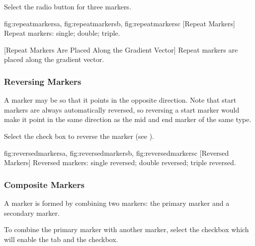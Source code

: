 
Select the  radio button for three markers.

{
  {fig:repeatmarkersa}{}{},
  {fig:repeatmarkersb}{}{},
  {fig:repeatmarkersc}{}{}
}
[Repeat Markers]
{Repeat markers:
 single;
 double;
 triple.}

{}
[Repeat Markers Are Placed Along the Gradient Vector]
{Repeat markers are placed along the gradient vector.}


\subsubsection{Reversing Markers}\label{sec:reversingmarkers}

A marker may be  so that it
points in the opposite direction. Note that start markers are always 
automatically reversed, so reversing a start marker would make it
point in the same direction as the mid and end marker of the same
type.


Select the  check box to reverse the marker
(see ).

{
  {fig:reversedmarkersa}{}{},
  {fig:reversedmarkersb}{}{},
  {fig:reversedmarkersc}{}{}
}
[Reversed Markers]
{Reversed markers:
 single reversed;
 double reversed;
 triple reversed.}

\subsubsection{Composite Markers}\label{sec:compositemarkers}

A  marker is formed by
combining two markers: the primary marker and a secondary marker.


To combine the primary marker with another marker, select the
 \gls{checkbox} which will enable the
 tab and the  checkbox.

